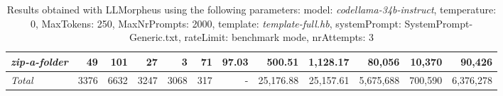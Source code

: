 \begin{table*}
{\begin{tabular}{l||r|r|r|r|r|r||r|r||r|r|r}
   \hline
   \textit{zip-a-folder} & 49 & 101 & 27 & 3 & 71 & 97.03 & 500.51 & 1,128.17 & 80,056 & 10,370 & 90,426 \\ 
   \hline
   \textit{Total} & 3376 & 6632 & 3247 & 3068 & 317 & - & 25,176.88  & 25,157.61 & 5,675,688 & 700,590 & 6,376,278 \\ 
 \end{tabular}
 }
 \caption{Results obtained with LLMorpheus using the following parameters: 
   model: \textit{codellama-34b-instruct}, 
   temperature: 0, 
   MaxTokens: 250, 
   MaxNrPrompts: 2000, 
   template: \textit{template-full.hb}, 
   systemPrompt: SystemPrompt-Generic.txt, 
   rateLimit: benchmark mode, 
   nrAttempts: 3  
 }
\end{table*}

